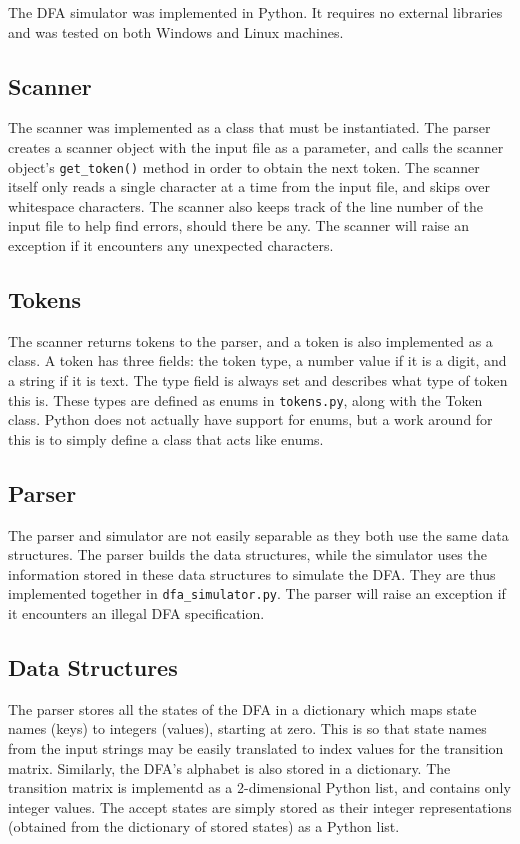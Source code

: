 \documentclass[11pt,a4paper]{article}
\begin{document}
The DFA simulator was implemented in Python. It requires no external libraries and was tested on both Windows
and Linux machines.

\subsection{Scanner}
The scanner was implemented as a class that must be instantiated. The parser creates a scanner object with the input file
as a parameter, and
calls the scanner object's \verb|get_token()| method in order to obtain the next token. The scanner
itself only reads a single character at a time from the input file, and skips over whitespace characters.
The scanner also keeps track of the line number of the input file to help find errors, should there be any.
The scanner will raise an exception if it encounters any unexpected characters.

\subsection{Tokens}
The scanner returns tokens to the parser, and a token is also implemented as a class. A token has three
fields: the token type, a number value if it is a digit, and a string if it is text. The type field is always set
and describes what type of token this is. These types are defined as enums in \verb|tokens.py|, along with the Token class.
Python does not actually have support for enums, but a work around for this is to simply define a class that acts like enums.

\subsection{Parser}
The parser and simulator are not easily separable as they both use the same data structures. The parser builds the data
structures, while the simulator uses the information stored in these data structures to simulate the DFA. They
are thus implemented together in \verb|dfa_simulator.py|. The parser will raise an exception if it encounters an illegal
DFA specification.

\subsection{Data Structures}
The parser stores all the states of the DFA in a dictionary
which maps state names (keys) to integers (values), starting at zero. This is so that state names from the input strings
may be easily translated to index values for the transition matrix.
Similarly, the DFA's alphabet is also stored in a dictionary.
The transition matrix is implementd as a 2-dimensional Python list, and contains only integer values.
The accept states are simply stored as their integer representations (obtained from the dictionary of stored states) as
a Python list.
\end{document}
